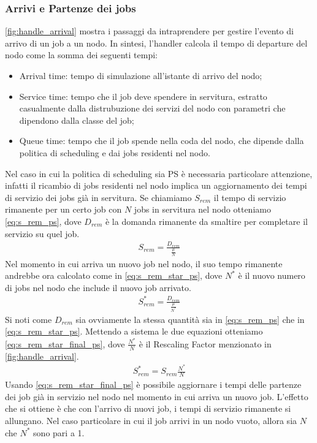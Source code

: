 \subsubsection{Arrivi e Partenze dei jobs}
\autoref{fig:handle_arrival} mostra i passaggi da intraprendere per gestire l'evento di arrivo di un job a un nodo. In sintesi, l'handler calcola il tempo di departure del nodo come la somma dei seguenti tempi:
\begin{itemize}
    \item Arrival time: tempo di simulazione all'istante di arrivo del nodo;
    \item Service time: tempo che il job deve spendere in servitura, estratto casualmente dalla distrubuzione dei servizi del nodo con parametri che dipendono dalla classe del job;
    \item Queue time: tempo che il job spende nella coda del nodo, che dipende dalla politica di scheduling e dai jobs residenti nel nodo.
\end{itemize}
Nel caso in cui la politica di scheduling sia PS è necessaria particolare attenzione, infatti il ricambio di jobs residenti nel nodo implica un aggiornamento dei tempi di servizio dei jobs già in servitura. Se chiamiamo $S_{rem}$ il tempo di servizio rimanente per un certo job con $N$ jobs in servitura nel nodo otteniamo \autoref{eq:s_rem_ps}, dove $D_{rem}$ è la domanda rimanente da smaltire per completare il servizio su quel job.
\begin{equation}
  \begin{aligned}
    S_{rem} = \frac{D_{rem}}{\frac{\mu}{N}}
  \end{aligned}
  \label{eq:s_rem_ps}
\end{equation}
Nel momento in cui arriva un nuovo job nel nodo, il suo tempo rimanente andrebbe ora calcolato come in \autoref{eq:s_rem_star_ps}, dove $N^*$ è il nuovo numero di jobs nel nodo che include il nuovo job arrivato.
\begin{equation}
  \begin{aligned}
    S^*_{rem} = \frac{D_{rem}}{\frac{\mu}{N^*}}
  \end{aligned}
  \label{eq:s_rem_star_ps}
\end{equation}
Si noti come $D_{rem}$ sia ovviamente la stessa quantità sia in \autoref{eq:s_rem_ps} che in \autoref{eq:s_rem_star_ps}. Mettendo a sistema le due equazioni otteniamo \autoref{eq:s_rem_star_final_ps}, dove $\frac{N^*}{N}$ è il Rescaling Factor menzionato in \autoref{fig:handle_arrival}.
\begin{equation}
  \begin{aligned}
    S^*_{rem} = S_{rem} \frac{N^*}{N}
  \end{aligned}
  \label{eq:s_rem_star_final_ps}
\end{equation}
Usando \autoref{eq:s_rem_star_final_ps} è possibile aggiornare i tempi delle partenze dei job già in servizio nel nodo nel momento in cui arriva un nuovo job. L'effetto che si ottiene è che con l'arrivo di nuovi job, i tempi di servizio rimanente si allungano. Nel caso particolare in cui il job arrivi in un nodo vuoto, allora sia $N$ che $N^*$ sono pari a 1.

